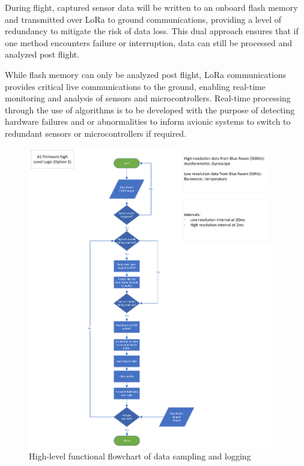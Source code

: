 During flight, captured sensor data will be written to an onboard flash memory and transmitted over LoRa to ground communications, providing a level of redundancy to mitigate the risk of data loss. This dual approach ensures that if one method encounters failure or interruption, data can still be processed and analyzed post flight. 

While flash memory can only be analyzed post flight, LoRa communications provides critical live communications to the ground, enabling real-time monitoring and analysis of sensors and microcontrollers. Real-time processing through the use of algorithms is to be developed with the purpose of detecting hardware failures and or abnormalities to inform avionic systems to switch to redundant sensors or microcontrollers if required.  

\begin{figure}[h]
  \begin{center}
    \includegraphics[width=0.95\textwidth]{img/flowchart-high_level.png}
  \end{center}
  \caption{High-level functional flowchart of data sampling and logging}\label{fig:flowchart-high_level}
\end{figure}

